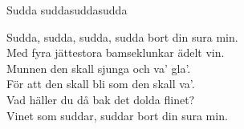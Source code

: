 \begin{song}{Sudda sudda}{suddasudda}
\begin{vers}
Sudda, sudda, sudda, sudda bort din sura min.\\
Med fyra jättestora bamseklunkar ädelt vin.\\
Munnen den skall sjunga och va' gla'.\\
För att den skall bli som den skall va'.\\
Vad häller du då bak det dolda flinet?\\
Vinet som suddar, suddar bort din sura min.\\
\end{vers}
\end{song}

